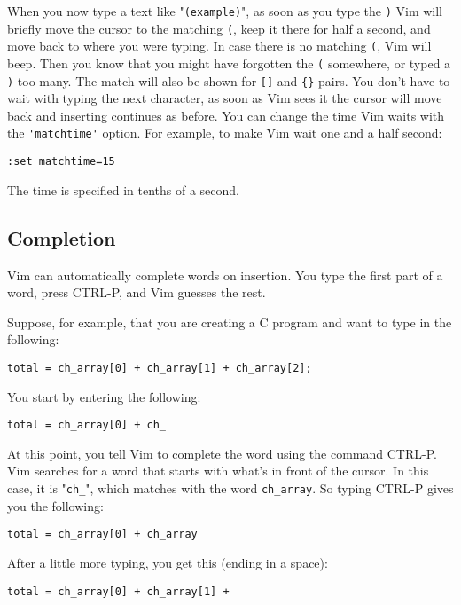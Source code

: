 When you now type a text like "\verb!(example)!", as soon as you type the \verb!)! Vim will briefly move the cursor to the matching \verb!(!, keep it there for half a second, and move back to where you were typing.
In case there is no matching \verb!(!, Vim will beep.
Then you know that you might have forgotten the \verb!(! somewhere, or typed a \verb!)! too many.
The match will also be shown for \verb![]! and \verb!{}! pairs.
You don't have to wait with typing the next character, as soon as Vim sees it the cursor will move back and inserting continues as before.
You can change the time Vim waits with the \verb!'matchtime'! option.
For example, to make Vim wait one and a half second:

\begin{Verbatim}[samepage=true]
 :set matchtime=15
\end{Verbatim}

The time is specified in tenths of a second.
\subsection{Completion}
Vim can automatically complete words on insertion.
You type the first part of a word, press CTRL-P, and Vim guesses the rest.

Suppose, for example, that you are creating a C program and want to type in the following:

\begin{Verbatim}[samepage=true]
    total = ch_array[0] + ch_array[1] + ch_array[2]; 
\end{Verbatim}

You start by entering the following:

\begin{Verbatim}[samepage=true]
    total = ch_array[0] + ch_ 
\end{Verbatim}

At this point, you tell Vim to complete the word using the command CTRL-P.
Vim searches for a word that starts with what's in front of the cursor.
In this case, it is "\verb!ch_!", which matches with the word \verb!ch_array!.
So typing CTRL-P gives you the following:

\begin{Verbatim}[samepage=true]
    total = ch_array[0] + ch_array 
\end{Verbatim}

After a little more typing, you get this (ending in a space):

\begin{Verbatim}[samepage=true]
    total = ch_array[0] + ch_array[1] +  
\end{Verbatim}

